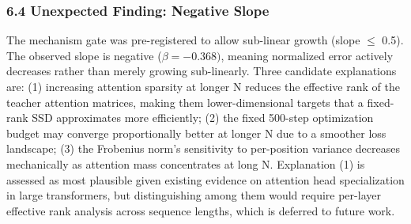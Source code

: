 \subsubsection{6.4 Unexpected Finding: Negative Slope}

The mechanism gate was pre-registered to allow sub-linear growth (slope $\leq$ 0.5). The observed slope is negative ($\beta = -0.368)$, meaning normalized error actively decreases rather than merely growing sub-linearly. Three candidate explanations are: (1) increasing attention sparsity at longer N reduces the effective rank of the teacher attention matrices, making them lower-dimensional targets that a fixed-rank SSD approximates more efficiently; (2) the fixed 500-step optimization budget may converge proportionally better at longer N due to a smoother loss landscape; (3) the Frobenius norm's sensitivity to per-position variance decreases mechanically as attention mass concentrates at long N. Explanation (1) is assessed as most plausible given existing evidence on attention head specialization in large transformers, but distinguishing among them would require per-layer effective rank analysis across sequence lengths, which is deferred to future work.

